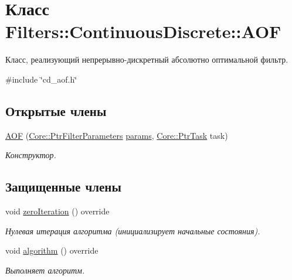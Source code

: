 \hypertarget{class_filters_1_1_continuous_discrete_1_1_a_o_f}{}\section{Класс Filters\+:\+:Continuous\+Discrete\+:\+:A\+OF}
\label{class_filters_1_1_continuous_discrete_1_1_a_o_f}


Класс, реализующий непрерывно-\/дискретный абсолютно оптимальной фильтр.  




{\ttfamily \#include \char`\"{}cd\+\_\+aof.\+h\char`\"{}}

\subsection*{Открытые члены}
\begin{DoxyCompactItemize}
\item 
\hyperlink{class_filters_1_1_continuous_discrete_1_1_a_o_f_a4ebfbe00caffe58eee6f8c06e25997db}{A\+OF} (\hyperlink{namespace_core_a4811af8148ba137d644b9a61a042cf03}{Core\+::\+Ptr\+Filter\+Parameters} \hyperlink{class_core_1_1_filter_a44aa749b49ba46256975ce545531ecf7}{params}, \hyperlink{namespace_core_abfda8f69fcacfcea2696549b548ed737}{Core\+::\+Ptr\+Task} task)\hypertarget{class_filters_1_1_continuous_discrete_1_1_a_o_f_a4ebfbe00caffe58eee6f8c06e25997db}{}\label{class_filters_1_1_continuous_discrete_1_1_a_o_f_a4ebfbe00caffe58eee6f8c06e25997db}

\begin{DoxyCompactList}\small\item\em Конструктор. \end{DoxyCompactList}\end{DoxyCompactItemize}
\subsection*{Защищенные члены}
\begin{DoxyCompactItemize}
\item 
void \hyperlink{class_filters_1_1_continuous_discrete_1_1_a_o_f_ab350a4de87a9e2c2e8b01e178d61f3b5}{zero\+Iteration} () override
\begin{DoxyCompactList}\small\item\em Нулевая итерация алгоритма (инициализирует начальные состояния). \end{DoxyCompactList}\item 
void \hyperlink{class_filters_1_1_continuous_discrete_1_1_a_o_f_a050849ffe1ada992988218805721914d}{algorithm} () override
\begin{DoxyCompactList}\small\item\em Выполняет алгоритм. \end{DoxyCompactList}\end{DoxyCompactItemize}
